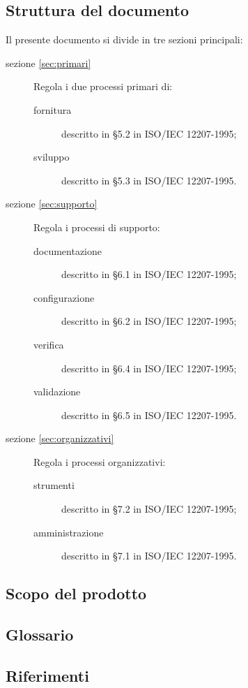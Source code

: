 \subsection{Struttura del documento}
Il presente documento si divide in tre sezioni principali:
\begin{description}
	\item[sezione \ref{sec:primari}] Regola i due processi primari di:
	\begin{description}
		\item[fornitura] descritto in §5.2 in ISO/IEC 12207-1995;
		\item[sviluppo] descritto in §5.3 in ISO/IEC 12207-1995.
	\end{description}
	\item[sezione \ref{sec:supporto}] Regola i processi di supporto:
	\begin{description}
		\item[documentazione] descritto in §6.1 in ISO/IEC 12207-1995;
		\item[configurazione] descritto in §6.2 in ISO/IEC 12207-1995;
		\item[verifica] descritto in §6.4 in ISO/IEC 12207-1995;
		\item[validazione] descritto in §6.5 in ISO/IEC 12207-1995.
	\end{description}
	\item[sezione \ref{sec:organizzativi}] Regola i processi organizzativi:
	\begin{description}
		\item[strumenti] descritto in §7.2 in ISO/IEC 12207-1995;
		\item[amministrazione] descritto in §7.1 in ISO/IEC 12207-1995.
	\end{description}
\end{description}

\subsection{Scopo del prodotto}
\scopo

\subsection{Glossario}
\presgloss

\subsection{Riferimenti}

